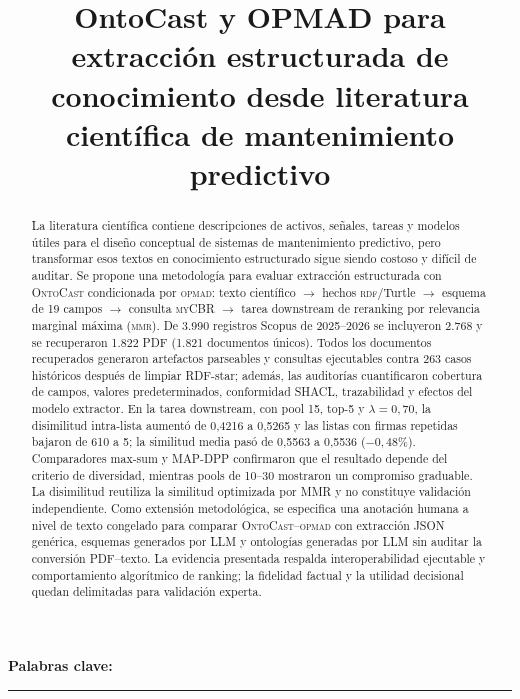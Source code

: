 \documentclass[11pt,a4paper]{article}
\title{\textbf{OntoCast y OPMAD para extracción estructurada de conocimiento desde literatura científica de mantenimiento predictivo}}
\author{}
\date{}
\newcommand{\OPMAD}{\textsc{opmad}}
\newcommand{\OntoCast}{\textsc{OntoCast}}
\newcommand{\myCBR}{\textsc{myCBR}}
\newcommand{\MMR}{\textsc{mmr}}
\newcommand{\RDF}{\textsc{rdf}}
\begin{document}
\maketitle

\begin{abstract}
La literatura científica contiene descripciones de activos, señales, tareas y modelos útiles para el diseño conceptual de sistemas de mantenimiento predictivo, pero transformar esos textos en conocimiento estructurado sigue siendo costoso y difícil de auditar. Se propone una metodología para evaluar extracción estructurada con \OntoCast{} condicionada por \OPMAD{}: texto científico $\rightarrow$ hechos \RDF/Turtle $\rightarrow$ esquema de 19 campos $\rightarrow$ consulta \myCBR{} $\rightarrow$ tarea downstream de reranking por relevancia marginal máxima (\MMR). De 3.990 registros Scopus de 2025--2026 se incluyeron 2.768 y se recuperaron 1.822 PDF (1.821 documentos únicos). Todos los documentos recuperados generaron artefactos parseables y consultas ejecutables contra 263 casos históricos después de limpiar RDF-star; además, las auditorías cuantificaron cobertura de campos, valores predeterminados, conformidad SHACL, trazabilidad y efectos del modelo extractor. En la tarea downstream, con pool 15, top-5 y $\lambda=0{,}70$, la disimilitud intra-lista aumentó de 0,4216 a 0,5265 y las listas con firmas repetidas bajaron de 610 a 5; la similitud media pasó de 0,5563 a 0,5536 ($-0{,}48\%$). Comparadores max-sum y MAP-DPP confirmaron que el resultado depende del criterio de diversidad, mientras pools de 10--30 mostraron un compromiso graduable. La disimilitud reutiliza la similitud optimizada por MMR y no constituye validación independiente. Como extensión metodológica, se especifica una anotación humana a nivel de texto congelado para comparar \OntoCast{}--\OPMAD{} con extracción JSON genérica, esquemas generados por LLM y ontologías generadas por LLM sin auditar la conversión PDF--texto. La evidencia presentada respalda interoperabilidad ejecutable y comportamiento algorítmico de ranking; la fidelidad factual y la utilidad decisional quedan delimitadas para validación experta.
\end{abstract}

\noindent\textbf{Palabras clave:} 

\begin{center}
\rule{0.92\linewidth}{0.4pt}
\end{center}
\end{document}
